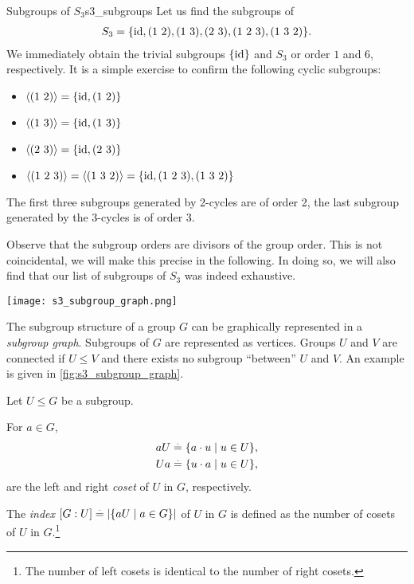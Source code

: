 \begin{ex}{Subgroups of $S_3$}{s3_subgroups}
Let us find the subgroups of \begin{align*}
    S_3 = \{\mathrm{id}, (1\ 2), (1\ 3), (2\ 3), (1\ 2\ 3), (1\ 3\ 2)\}.
\end{align*} We immediately obtain the trivial subgroups $\{\mathrm{id}\}$ and $S_3$ or order $1$ and $6$, respectively. It is a simple exercise to confirm the following cyclic subgroups: \begin{itemize}
    \item $\gen{(1\ 2)} = \{\id, (1\ 2)\}$
    \item $\gen{(1\ 3)} = \{\id, (1\ 3)\}$
    \item $\gen{(2\ 3)} = \{\id, (2\ 3)\}$
    \item $\langle (1\ 2\ 3) \rangle = \langle (1\ 3\ 2) \rangle = \{\mathrm{id}, (1\ 2\ 3), (1\ 3\ 2)\}$
\end{itemize} The first three subgroups generated by 2-cycles are of order 2, the last subgroup generated by the 3-cycles is of order 3.

Observe that the subgroup orders are divisors of the group order. This is not coincidental, we will make this precise in the following. In doing so, we will also find that our list of subgroups of $S_3$ was indeed exhaustive.
\end{ex}

\begin{marginfigure}
    \texttt{[image: s3\_subgroup\_graph.png]}
    \caption{Subgroup graph of the symmetric group $S_3$.}\label{fig:s3_subgroup_graph}
\end{marginfigure}
    
The subgroup structure of a group $G$ can be graphically represented in a \emph{subgroup graph}. Subgroups of $G$ are represented as vertices. Groups $U$ and $V$ are connected if $U \leq V$ and there exists no subgroup ``between'' $U$ and $V$. An example is given in \cref{fig:s3_subgroup_graph}.

\begin{defn}
Let $U \leq G$ be a subgroup.
\begin{defnlist}
    \item For $a \in G$, \begin{align}
        aU &\overset{.}{=} \{a \cdot u \mid u \in U\}, \\
        Ua &\overset{.}{=} \{u \cdot a \mid u \in U\},
    \end{align} are the left and right \emph{coset} of $U$ in $G$, respectively.
    \item The \emph{index} $[G : U] \overset{.}{=} |\{aU \mid a \in G\}|$ of $U$ in $G$ is defined as the number of cosets of $U$ in $G$.\footnote{The number of left cosets is identical to the number of right cosets.}
\end{defnlist}
\end{defn}

